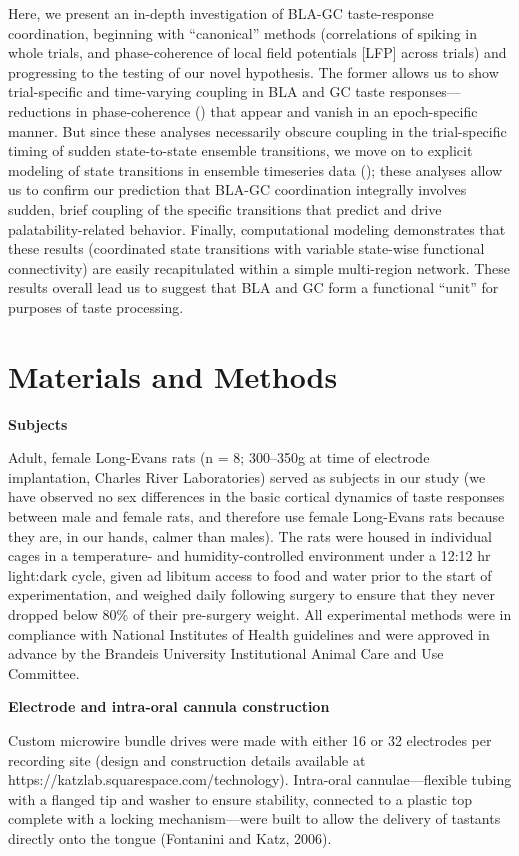 \begin{refsection}
Here, we present an in-depth investigation of BLA-GC taste-response coordination, beginning with “canonical” methods (correlations of spiking in whole trials, and phase-coherence of local field potentials [LFP] across trials) and progressing to the testing of our novel hypothesis. The former allows us to show trial-specific and time-varying coupling in BLA and GC taste responses—reductions in phase-coherence (\cite{stitt2017a}) that appear and vanish in an epoch-specific manner. But since these analyses necessarily obscure coupling in the trial-specific timing of sudden state-to-state ensemble transitions, we move on to explicit modeling of state transitions in ensemble timeseries data (\cite{rabiner1989a,sadacca2016a}); these analyses allow us to confirm our prediction that BLA-GC coordination integrally involves sudden, brief coupling of the specific transitions that predict and drive palatability-related behavior. Finally, computational modeling demonstrates that these results (coordinated state transitions with variable state-wise functional connectivity) are easily recapitulated within a simple multi-region network. These results overall lead us to suggest that BLA and GC form a functional “unit” for purposes of taste processing. 

\section{Materials and Methods}


\textbf{Subjects}\par
\noindent Adult, female Long-Evans rats (n = 8; 300–350g at time of electrode implantation, Charles River Laboratories) served as subjects in our study (we have observed no sex differences in the basic cortical dynamics of taste responses between male and female rats, and therefore use female Long-Evans rats because they are, in our hands, calmer than males). The rats were housed in individual cages in a temperature- and humidity-controlled environment under a 12:12 hr light:dark cycle, given ad libitum access to food and water prior to the start of experimentation, and weighed daily following surgery to ensure that they never dropped below 80\% of their pre-surgery weight. All experimental methods were in compliance with National Institutes of Health guidelines and were approved in advance by the Brandeis University Institutional Animal Care and Use Committee.

\smallskip
\noindent\textbf{Electrode and intra-oral cannula construction}\par
\noindent Custom microwire bundle drives were made with either 16 or 32 electrodes per recording site (design and construction details available at https://katzlab.squarespace.com/technology). Intra-oral cannulae—flexible tubing with a flanged tip and washer to ensure stability, connected to a plastic top complete with a locking mechanism—were built to allow the delivery of tastants directly onto the tongue (Fontanini and Katz, 2006).


\end{refsection}
